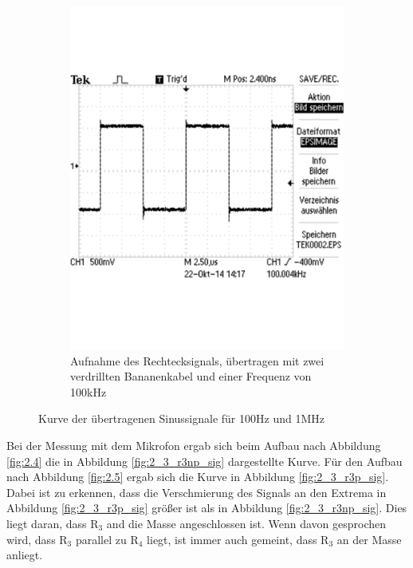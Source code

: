 \documentclass[12pt,a4paper]{article}
\begin{document}
\begin{figure}[H]
\begin{subfigure}[b]{0.48\textwidth}
                \includegraphics[width=\textwidth , scale = 0.4]{2_3_vgl_1.pdf}
                \caption[Aufnahme des Rechtecksignals, übertragen mit zwei verdrillten Bananenkabel und einer Frequenz von 100kHz]{Aufnahme des Rechtecksignals, übertragen mit zwei verdrillten Bananenkabel und einer Frequenz von 100kHz}
 				\label{fig:2_3_vgl_1}
        \end{subfigure}
        \caption{Kurve der übertragenen Sinussignale für 100Hz und 1MHz}
        \label{fig:2_3_rech_vergleich_ohne_mikro}
\end{figure}


Bei der Messung mit dem Mikrofon ergab sich beim Aufbau nach Abbildung \ref{fig:2.4} die in Abbildung \ref{fig:2_3_r3np_sig} dargestellte Kurve. Für den Aufbau nach Abbildung \ref{fig:2.5} ergab sich die Kurve in Abbildung \ref{fig:2_3_r3p_sig}. Dabei ist zu erkennen, dass die Verschmierung des Signals an den Extrema in Abbildung \ref{fig:2_3_r3p_sig} größer ist als in Abbildung \ref{fig:2_3_r3np_sig}. Dies liegt daran, dass R$_3$ and die Masse angeschlossen ist.
Wenn davon gesprochen wird, dass R$_3$ parallel zu R$_4$ liegt, ist immer auch gemeint, dass R$_3$ an der Masse anliegt.
\end{document}
